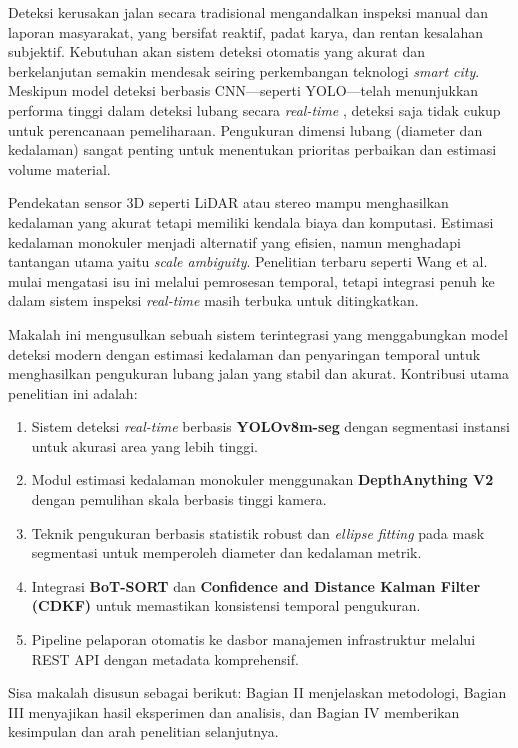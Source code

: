 \documentclass{iopjournal}
\begin{document}
Deteksi kerusakan jalan secara tradisional mengandalkan inspeksi manual dan laporan masyarakat, yang bersifat reaktif, padat karya, dan rentan kesalahan subjektif. Kebutuhan akan sistem deteksi otomatis yang akurat dan berkelanjutan semakin mendesak seiring perkembangan teknologi \textit{smart city}. Meskipun model deteksi berbasis CNN—seperti YOLO—telah menunjukkan performa tinggi dalam deteksi lubang secara \textit{real-time} \cite{gorro2024}, deteksi saja tidak cukup untuk perencanaan pemeliharaan. Pengukuran dimensi lubang (diameter dan kedalaman) sangat penting untuk menentukan prioritas perbaikan dan estimasi volume material.

Pendekatan sensor 3D seperti LiDAR atau stereo mampu menghasilkan kedalaman yang akurat tetapi memiliki kendala biaya dan komputasi. Estimasi kedalaman monokuler menjadi alternatif yang efisien, namun menghadapi tantangan utama yaitu \textit{scale ambiguity}. Penelitian terbaru seperti Wang et al. \cite{wang2025} mulai mengatasi isu ini melalui pemrosesan temporal, tetapi integrasi penuh ke dalam sistem inspeksi \textit{real-time} masih terbuka untuk ditingkatkan.

Makalah ini mengusulkan sebuah sistem terintegrasi yang menggabungkan model deteksi modern dengan estimasi kedalaman dan penyaringan temporal untuk menghasilkan pengukuran lubang jalan yang stabil dan akurat. Kontribusi utama penelitian ini adalah:
\begin{enumerate}
    \item Sistem deteksi \textit{real-time} berbasis \textbf{YOLOv8m-seg} dengan segmentasi instansi untuk akurasi area yang lebih tinggi.
    \item Modul estimasi kedalaman monokuler menggunakan \textbf{DepthAnything V2} dengan pemulihan skala berbasis tinggi kamera.
    \item Teknik pengukuran berbasis statistik robust dan \textit{ellipse fitting} pada mask segmentasi untuk memperoleh diameter dan kedalaman metrik.
    \item Integrasi \textbf{BoT-SORT} dan \textbf{Confidence and Distance Kalman Filter (CDKF)} untuk memastikan konsistensi temporal pengukuran.
    \item Pipeline pelaporan otomatis ke dasbor manajemen infrastruktur melalui REST API dengan metadata komprehensif.
\end{enumerate}

Sisa makalah disusun sebagai berikut: Bagian II menjelaskan metodologi, Bagian III menyajikan hasil eksperimen dan analisis, dan Bagian IV memberikan kesimpulan dan arah penelitian selanjutnya.
\end{document}
